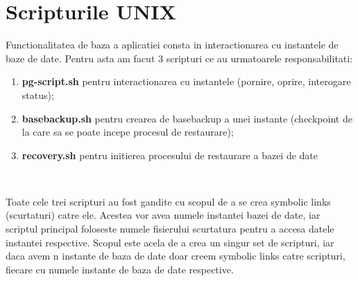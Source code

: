 \section{Scripturile UNIX}
Functionalitatea de baza a aplicatiei consta in interactionarea cu instantele de baze de date. Pentru asta am facut 3 scripturi ce au urmatoarele responsabilitati:
\begin{enumerate}
\item \textbf{pg-script.sh} pentru interactionarea cu instantele (pornire, oprire, interogare status);
\\
\item \textbf{basebackup.sh} pentru crearea de basebackup a unei instante (checkpoint de la care sa se poate incepe procesul de restaurare);
\\
\item \textbf{recovery.sh} pentru initierea procesului de restaurare a bazei de date
\\
\end{enumerate}\
\par
Toate cele trei scripturi au fost gandite cu scopul de a se crea symbolic links (scurtaturi) catre ele. Acestea vor avea numele instantei bazei de date, iar scriptul principal foloseste numele fisierului scurtatura pentru a accesa datele instantei respective. Scopul este acela de a crea un singur set de scripturi, iar daca avem n instante de baza de date doar creem symbolic links catre scripturi, fiecare cu numele instante de baza de date respective.
\newpage
